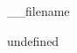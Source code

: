 
\_\_filename\mktsShowpar\par
undefined\mktsShowpar\par
[ 'reserved\_names', '\_\_filename' ]\mktsShowpar\par
[ 'reserved\_names', '\_\_filename' ]\mktsShowpar\par

